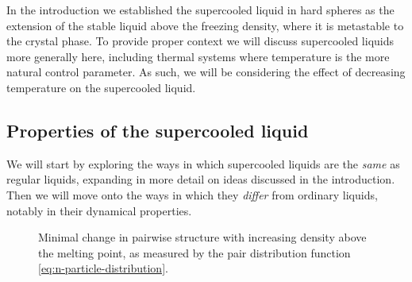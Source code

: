 
In the introduction we established the supercooled liquid in hard spheres as the extension of the stable liquid above the freezing density, where it is metastable to the crystal phase.
To provide proper context we will discuss supercooled liquids more generally here, including thermal systems where temperature is the more natural control parameter.
As such, we will be considering the effect of decreasing temperature on the supercooled liquid.


\subsection{Properties of the supercooled liquid}

We will start by exploring the ways in which supercooled liquids are the \emph{same} as regular liquids, expanding in more detail on ideas discussed in the introduction.
Then we will move onto the ways in which they \emph{differ} from ordinary liquids, notably in their dynamical properties.

\begin{SCfigure}
  \caption[Structural change in the supercooled liquid (at the pair level)]{
    Minimal change in pairwise structure with increasing density above the melting point, as measured by the pair distribution function \eqref{eq:n-particle-distribution}.
  }
  \label{fig:g2-changes}
\end{SCfigure}

